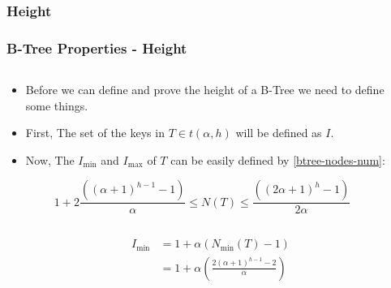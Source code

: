 \documentclass{beamer}
\begin{document}
\begin{frame}
    \subsubsection{Height}
    \frametitle{B-Tree Properties - Height}
    \begin{columns}
        \begin{column}{\textlecolumn}
            \begin{block}{}
                \begin{itemize}
                    \item Before we can define and prove the height of a B-Tree we need to define some things.
                    \item First, The set of the keys in \(T \in t\left(\alpha, h\right)\) will be defined as \(I\). 
                    \item Now, The \(I_{\text{min}}\) and \(I_{\text{max}}\) of \(T\) can be easily defined by \eqref{btree-nodes-num}:
                \end{itemize}
            \end{block}
            \vspace{-0.35cm}
            \begin{tcolorbox}[boxsep=0mm,left=0mm,right=0mm,top=-2mm,halign=right]
                \[
                    1 + 2\frac{\left(\left(\alpha + 1\right)^{h - 1} - 1\right)}{\alpha} 
                    \leq 
                    N\left(T\right) 
                    \leq 
                    \frac{\left(\left(2\alpha + 1\right)^{h} - 1\right)}{2\alpha}
                \]
            \end{tcolorbox}
        \end{column}
        \begin{column}{\textricolumn}
        \end{column}
    \end{columns}
    \begin{columns}
        \begin{column}{0.5\textwidth}
            \vspace{-0.75cm}
            \begin{block}{}
                \[
                    \begin{aligned}
                        I_{\text{min}} &= 1 + \alpha\left(N_{\text{min}}\left(T\right) - 1\right) \\
                        &= 1 + \alpha\left(\frac{2\left(\alpha + 1\right)^{h - 1} - 2}{\alpha}\right) \\

\end{aligned}\]
\end{block}
\end{column}
\end{columns}
\end{frame}
\end{document}

